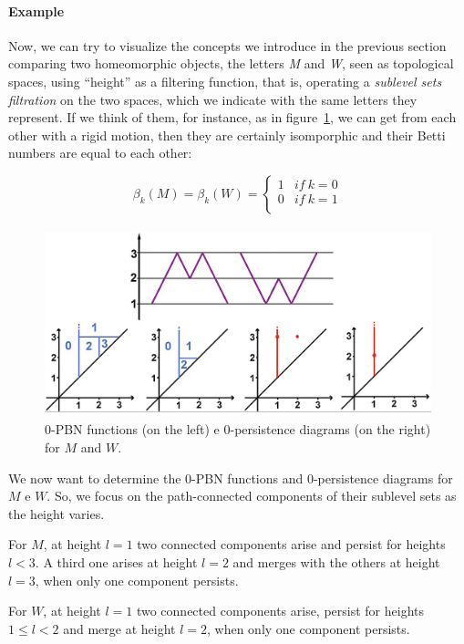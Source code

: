 \documentclass[english, LaM, oneside, noexaminfo]{sapthesis}
\begin{document}
\paragraph{Example}
\label{example}

Now, we can try to visualize the concepts we introduce in the previous section comparing two homeomorphic objects, the letters \textit{M} and \textit{W}, seen as topological spaces, using “height” as a filtering function, that is, operating a \textit{sublevel sets filtration} on the two spaces, which we indicate with the same letters they represent. If we think of them, for instance, as in figure~\ref{fig:M_W}, we can get from each other with a rigid motion, then they are certainly isomporphic and their Betti numbers are equal to each other:

$$\beta_k(M) =\beta_k(W) = \left \{
\begin{array}{lr}
1 & if \ k=0 \\
0 & if \ k=1 \\
\end{array}\right.$$ 

\begin{figure}[tb]
\centering
\includegraphics[height=5.5cm]{M_W 0-PBN 0-PDs.png}
\caption{$0$-PBN functions (on the left) e $0$-persistence diagrams (on the right) for $M$ and $W$.}\label{fig:M_W}
\end{figure}

\noindent We now want to determine the $0$-PBN functions and $0$-persistence diagrams for $M$ e $W$. So, we focus on the path-connected components of their sublevel sets as the height varies. 

\noindent For $M$, at height $l = 1$ two connected components arise and persist for heights $l<3$. A third one arises at height $l=2$ and merges with the others at height $l=3$, when only one component persists.

\noindent For $W$, at height $l = 1$ two connected components arise, persist for heights $1 \leq l <2$ and merge at height $l=2$, when only one component persists.
\end{document}
